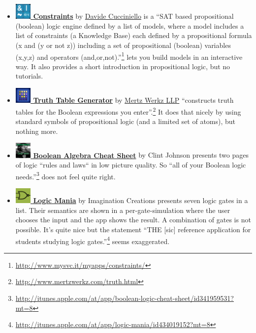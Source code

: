 \begin{itemize}

\item  \href{http://itunes.apple.com/at/app/constraints/id418722652?mt=8}{\bf 
\includegraphics[width=0.8cm]{related/Constraints.png} Constraints}
by 
\href{http://www.mysvc.it/myapps/constraints/}{Davide Cucciniello} 
is a “SAT based propositional (boolean) logic engine defined by a list of models, 
where a model includes a list of constraints (a Knowledge Base) 
each defined by a propositional formula (x and (y or not z)) 
including a set of propositional (boolean) variables (x,y,z) 
and operators (and,or,not).”\footnote{
\url{http://www.mysvc.it/myapps/constraints/}} 
lets you build models in an interactive way. It also provides a short introduction in propositional logic, but no tutorials.


\item \href{http://itunes.apple.com/at/app/truth-table-generator/id507190346?mt=8}{\bf 
\includegraphics[width=0.8cm]{related/TruthTables.png} Truth Table Generator} 
by
\href{http://www.mertzwerkz.com/truth.html}{Mertz Werkz LLP}    
“constructs truth tables for the Boolean expressions you enter”.\footnote{
\url{http://www.mertzwerkz.com/truth.html}}
It does that nicely by using standard symbols of propositional logic (and a limited set of atoms), but nothing more.

\item
\href{http://itunes.apple.com/at/app/boolean-logic-cheat-sheet/id341959531?mt=8}{\bf 
\includegraphics[width=0.8cm]{related/CheatSheet.png} Boolean Algebra Cheat Sheet} 
by 
{Clint Johnson} presents two pages of logic “rules and laws“ in low picture quality. So “all of your Boolean 
logic needs.”\footnote{
\url{http://itunes.apple.com/at/app/boolean-logic-cheat-sheet/id341959531?mt=8}} 
does not feel quite right.

\item
\href{http://itunes.apple.com/at/app/logic-mania/id434019152?mt=8}{\bf 
\includegraphics[width=0.8cm]{related/LogicMania.png} Logic Mania} 
by 
{Imagination Creations} presents seven logic gates in a list. 
Their semantics are shown in a per-gate-simulation where the user chooses the input and the app shows the result. 
A combination of gates is not possible. It's quite nice but the statement “THE [sic] reference application for students 
studying logic gates.”\footnote{
\url{http://itunes.apple.com/at/app/logic-mania/id434019152?mt=8}}
seems exaggerated.


\end{itemize}
